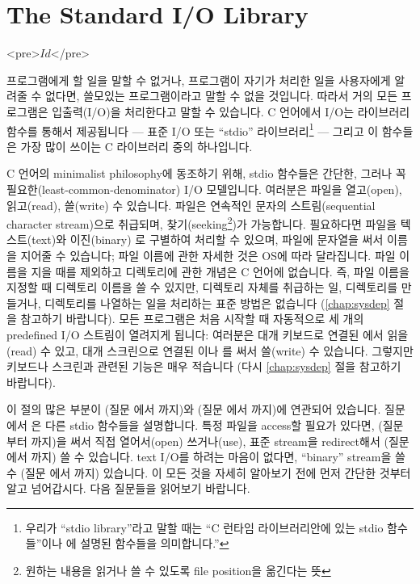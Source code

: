 \chapter{The Standard I/O Library}	\label{chap:stdio}

\begin{rawhtml}
<pre>$Id$</pre>
\end{rawhtml}

프로그램에게 할 일을 말할 수 없거나, 프로그램이 자기가 처리한 일을 
사용자에게 알려줄 수 없다면, 쓸모있는 프로그램이라고 말할 수 없을 것입니다.
따라서 거의 모든 프로그램은 입출력(I/O)을 처리한다고 말할 수 있습니다.
C 언어에서 I/O는 라이브러리 함수를 통해서 제공됩니다 --- 표준 I/O 또는
``stdio'' 라이브러리\footnote{우리가 ``stdio library''라고 말할 때는
``C 런타임 라이브러리안에 있는 stdio 함수들''이나 에
설명된 함수들을 의미합니다.''} --- 그리고 이 함수들은 가장 많이 쓰이는
C 라이브러리 중의 하나입니다.

C 언어의 minimalist philosophy에 동조하기 위해, stdio 함수들은 간단한,
그러나 꼭 필요한(least-common-denominator) I/O 모델입니다.
여러분은 파일을 열고(open), 읽고(read), 쓸(write) 수 있습니다.
파일은 연속적인 문자의 스트림(sequential character stream)으로 취급되며,
찾기(seeking\footnote{원하는 내용을 읽거나 쓸 수 있도록 file position을
옮긴다는 뜻})가 가능합니다.   필요하다면 파일을 텍스트(text)와 이진(binary)
로 구별하여 처리할 수 있으며, 파일에 문자열을 써서 이름을 지어줄 수 있습니다;
파일 이름에 관한 자세한 것은 OS에 따라 달라집니다.   파일 이름을 지을 때를
제외하고 디렉토리에 관한 개념은 C 언어에 없습니다.   즉, 파일 이름을 지정할
때 디렉토리 이름을 쓸 수 있지만, 디렉토리 자체를 취급하는 일,  디렉토리를
만들거나, 디렉토리를 나열하는 일을 처리하는 표준 방법은 없습니다
(\ref{chap:sysdep} 절을 참고하기 바랍니다).   모든 프로그램은 처음
시작할 때 자동적으로 세 개의 predefined I/O 스트림이 열려지게 됩니다:
여러분은 대개 키보드로 연결된 에서 읽을(read) 수 있고,
대개 스크린으로 연결된 이나 를 써서 쓸(write) 수
있습니다.   그렇지만 키보드나 스크린과 관련된 기능은 매우 적습니다
(다시 \ref{chap:sysdep} 절을 참고하기 바랍니다).

이 절의 많은 부분이  (질문 에서 까지)와
 (질문 에서 까지)에 연관되어 있습니다.  질문
에서 은 다른 stdio 함수들을 설명합니다.  특정 파일을
access할 필요가 있다면,  (질문 부터 까지)을 써서
직접 열어서(open) 쓰거나(use), 표준 stream을 redirect해서 (질문 에서
까지) 쓸 수 있습니다.  text I/O를 하려는 마음이 없다면, ``binary''
stream을 쓸 수 (질문 에서 까지) 있습니다.  이 모든 것을
자세히 알아보기 전에 먼저 간단한 것부터 알고 넘어갑시다.  다음 질문들을
읽어보기 바랍니다.

